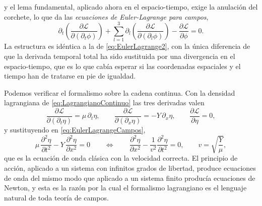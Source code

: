         y el lema fundamental, aplicado ahora en el espacio-tiempo, exige la anulación del corchete, lo que da las \textit{ecuaciones de Euler-Lagrange para campos},
        \begin{equation}\label{eq:EulerLagrangeCampos}
            \boxed{\;\partial_{t}\left(\frac{\partial\mathcal{L}}{\partial\left(\partial_{t}\phi\right)}\right)
            + \sum_{l=1}^{3}\partial_{l}\left(\frac{\partial\mathcal{L}}{\partial\left(\partial_{l}\phi\right)}\right)
            - \frac{\partial\mathcal{L}}{\partial\phi} = 0 .\;}
        \end{equation}
        La estructura es idéntica a la de \eqref{eq:EulerLagrange2}, con la única diferencia de que la derivada temporal total ha sido sustituida por una divergencia en el espacio-tiempo, que es lo que cabía esperar si las coordenadas espaciales y el tiempo han de tratarse en pie de igualdad.

        Podemos verificar el formalismo sobre la cadena continua. Con la densidad lagrangiana de \eqref{eq:LagrangianoContinuo} las tres derivadas valen
        \begin{equation}\label{eq:DerivadasCadena}
            \frac{\partial\mathcal{L}}{\partial\left(\partial_{t}\eta\right)} = \mu\,\partial_{t}\eta,
            \qquad
            \frac{\partial\mathcal{L}}{\partial\left(\partial_{x}\eta\right)} = -Y\,\partial_{x}\eta,
            \qquad
            \frac{\partial\mathcal{L}}{\partial\eta} = 0,
        \end{equation}
        y sustituyendo en \eqref{eq:EulerLagrangeCampos},
        \begin{equation}\label{eq:OndaCadena}
            \mu\,\frac{\partial^{2}\eta}{\partial t^{2}} - Y\,\frac{\partial^{2}\eta}{\partial x^{2}} = 0
            \qquad\Longleftrightarrow\qquad
            \frac{\partial^{2}\eta}{\partial x^{2}} - \frac{1}{v^{2}}\frac{\partial^{2}\eta}{\partial t^{2}} = 0,
            \qquad v = \sqrt{\frac{Y}{\mu}},
        \end{equation}
        que es la ecuación de onda clásica con la velocidad correcta. El principio de acción, aplicado a un sistema con infinitos grados de libertad, produce ecuaciones de onda del mismo modo que aplicado a un sistema finito producía ecuaciones de Newton, y esta es la razón por la cual el formalismo lagrangiano es el lenguaje natural de toda teoría de campos.

